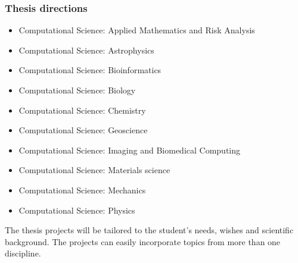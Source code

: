 \documentclass{beamer}
\begin{document}
\begin{frame}
\frametitle{Thesis directions}

\begin{block}{}

\begin{itemize}
\item Computational Science: Applied Mathematics and Risk Analysis

\item Computational Science: Astrophysics

\item Computational Science: Bioinformatics

\item Computational Science: Biology

\item Computational Science: Chemistry

\item Computational Science: Geoscience

\item Computational Science: Imaging and Biomedical Computing

\item Computational Science: Materials science

\item Computational Science: Mechanics

\item Computational Science: Physics
\end{itemize}

\noindent
The thesis projects will be tailored to the student's needs, wishes and scientific background. The projects can easily incorporate topics from more than one discipline.
\end{block}
\end{frame}
\end{document}
